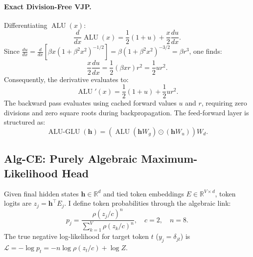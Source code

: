 \documentclass[11pt,a4paper]{article}
\theoremstyle{definition}
\begin{document}
\paragraph{Exact Division-Free VJP.}
Differentiating $\operatorname{ALU}(x)$:
\begin{equation}
\frac{d}{dx}\operatorname{ALU}(x) = \frac{1}{2}(1 + u) + \frac{x}{2}\frac{du}{dx}.
\end{equation}
Since $\frac{du}{dx} = \frac{d}{dx}\left[\beta x (1 + \beta^2 x^2)^{-1/2}\right] = \beta (1 + \beta^2 x^2)^{-3/2} = \beta r^3$, one finds:
\begin{equation}
\frac{x}{2}\frac{du}{dx} = \frac{1}{2}(\beta x r) r^2 = \frac{1}{2} u r^2.
\end{equation}
Consequently, the derivative evaluates to:
\begin{equation}
\label{eq:alu_vjp}
\operatorname{ALU}'(x) = \frac{1}{2}(1 + u) + \frac{1}{2} u r^2.
\end{equation}
The backward pass evaluates  using cached forward values $u$ and $r$, requiring zero divisions and zero square roots during backpropagation. The feed-forward layer is structured as:
\begin{equation}
\operatorname{ALU-GLU}(\mathbf{h}) = \left(\operatorname{ALU}(\mathbf{h} W_g) \odot (\mathbf{h} W_u)\right) W_d.
\end{equation}

\subsection{Alg-CE: Purely Algebraic Maximum-Likelihood Head}
\label{subsec:alg_ce}

Given final hidden states $\mathbf{h} \in \mathbb{R}^d$ and tied token embeddings $E \in \mathbb{R}^{V \times d}$, token logits are $z_j = \mathbf{h}^\top E_j$. I define token probabilities through the algebraic link:
\begin{equation}
\label{eq:alg_ce_prob}
p_j = \frac{\rho(z_j / c)^n}{\sum_{k=1}^V \rho(z_k / c)^n}, \quad c = 2, \quad n = 8.
\end{equation}
The true negative log-likelihood for target token $t$ ($y_j = \delta_{jt}$) is $\mathcal{L} = -\log p_t = -n \log \rho(z_t / c) + \log Z$.
\end{document}
